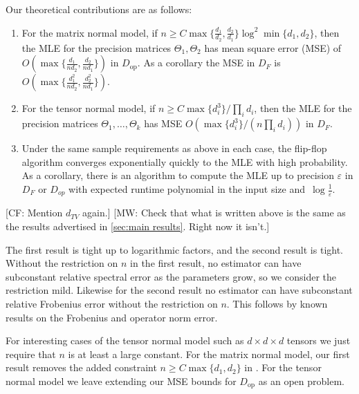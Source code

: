 \documentclass[aos]{imsart}
\theoremstyle{definition}
\numberwithin{equation}{section}
\DeclareMathOperator{\op}{op}
\newcommand{\eps}{\varepsilon}
\newcommand{\CF}[1]{{\color{purple}[CF: #1]}}
\newcommand{\MW}[1]{{\color{red}[MW: #1]}}
\begin{document}
Our theoretical contributions are as follows:
\begin{enumerate}
\item For the matrix normal model, if $n \geq C \max\{\frac{d_1}{d_2},\frac{d_2}{d_1}\} \log^2 \min\{d_1,d_2\}$, then the MLE for the precision matrices $\Theta_1, \Theta_2$ has mean square error (MSE) of $O( \max\{ \frac{d_1}{nd_2}, \frac{d_2}{nd_1} \} )$ in $D_{\op}$.
As a corollary the MSE in $D_F$ is $O( \max \{ \frac{d_1^2}{nd_2}, \frac{d_2^2}{nd_1} \} )$.
\item For the tensor normal model, if $n \geq C \max\{d_i^3\}/ \prod_i d_i$, then the MLE for the precision matrices $\Theta_1, \dots, \Theta_k$ has MSE $O(\max \{ d_i^3 \} / (n \prod_i d_i ) )$ in $D_F$.
\item Under the same sample requirements as above in each case, the flip-flop algorithm converges exponentially quickly to the MLE with high probability.
As a corollary, there is an algorithm to compute the MLE up to precision $\eps$ in $D_F$ or $D_{op}$ with expected runtime polynomial in the input size and~$\log\frac1\eps$.
\end{enumerate}
\CF{Mention $d_{TV}$ again.}
\MW{Check that what is written above is the same as the results advertised in \cref{sec:main results}. Right now it isn't.}

The first result is tight up to logarithmic factors, and the second result is tight.
Without the restriction on $n$ in the first result, no estimator can have subconstant relative spectral error as the parameters grow, so we consider the restriction mild. Likewise for the second result no estimator can have subconstant relative Frobenius error without the restriction on $n$. This follows by known results on the Frobenius and operator norm error.


For interesting cases of the tensor normal model such as $d\times d \times d$ tensors we just require that $n$ is at least a large constant.
For the matrix normal model, our first result removes the added constraint $n \geq C \max\{d_1,d_2\}$ in \cite{tsiligkaridis2013convergence}.
For the tensor normal model we leave extending our MSE bounds for $D_{\op}$ as an open problem.
\end{document}
